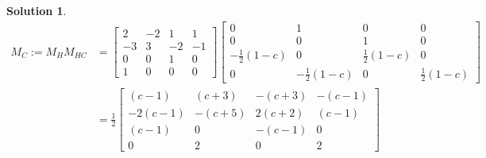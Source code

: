 \documentclass[10pt]{article}
\theoremstyle{plain}
\theoremstyle{definition}
\newtheorem*{soln*}{Solution}
\numberwithin{equation}{section}
\begin{document}
\begin{soln*}
\begin{align*}
            M_C := M_H M_{HC}
            &= \begin{bmatrix}
                2 & {-2} & 1 & 1 \\
                {-3} & 3 & {-2} & -1 \\
                0 & 0 & 1 & 0 \\
                1 & 0 & 0 & 0 \end{bmatrix}
            \begin{bmatrix}
                0 & 1 & 0 & 0 \\
                0 & 0 & 1 & 0 \\
                -\frac{1}{2}(1-c) & 0 & \frac{1}{2}(1-c) & 0 \\
                0 & -\frac{1}{2}(1-c) & 0 & \frac{1}{2}(1-c)
            \end{bmatrix} \\
            &= 
            \frac{1}{2} \begin{bmatrix}
                (c-1)   & (c+3)     & -(c+3)    & -(c-1)    \\
                -2(c-1) & -(c+5)    & 2(c+2)    & (c-1)     \\
                (c-1)   & 0         & -(c-1)    & 0         \\
                0       & 2         & 0         & 2
            \end{bmatrix}
    \end{align*}
    

\end{soln*}
\end{document}
